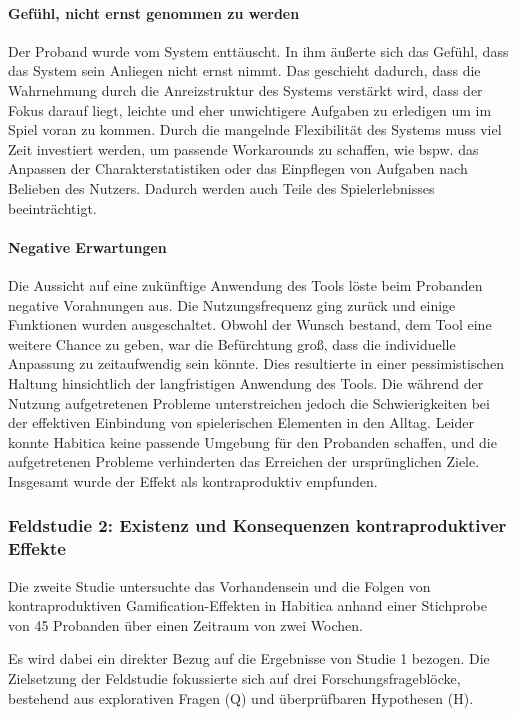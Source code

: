 \documentclass[sigconf, nonacm]{acmart}
\begin{document}
\paragraph{Gefühl, nicht ernst genommen zu werden}\label{sec:sr2}
Der Proband wurde vom System enttäuscht. In ihm äußerte sich das Gefühl, dass das System sein Anliegen nicht ernst nimmt. Das geschieht dadurch, dass die Wahrnehmung durch die Anreizstruktur des Systems verstärkt wird, dass der Fokus darauf liegt, leichte und eher unwichtigere Aufgaben zu erledigen um im Spiel voran zu kommen. 
Durch die mangelnde Flexibilität des Systems muss viel Zeit investiert werden, um passende Workarounds zu schaffen, wie bspw. das Anpassen der Charakterstatistiken oder das Einpflegen von Aufgaben nach Belieben des Nutzers. Dadurch werden auch Teile des Spielerlebnisses beeinträchtigt.

\paragraph{Negative Erwartungen}\label{sec:sr3}
Die Aussicht auf eine zukünftige Anwendung des Tools löste beim Probanden negative Vorahnungen aus. Die Nutzungsfrequenz ging zurück und einige Funktionen wurden ausgeschaltet. Obwohl der Wunsch bestand, dem Tool eine weitere Chance zu geben, war die Befürchtung groß, dass die individuelle Anpassung zu zeitaufwendig sein könnte. Dies resultierte in einer pessimistischen Haltung hinsichtlich der langfristigen Anwendung des Tools. Die während der Nutzung aufgetretenen Probleme unterstreichen jedoch die Schwierigkeiten bei der effektiven Einbindung von spielerischen Elementen in den Alltag. Leider konnte Habitica keine passende Umgebung für den Probanden schaffen, und die aufgetretenen Probleme verhinderten das Erreichen der ursprünglichen Ziele. Insgesamt wurde der Effekt als kontraproduktiv empfunden.

\subsubsection{Feldstudie 2: Existenz und Konsequenzen kontraproduktiver Effekte}
Die zweite Studie untersuchte das Vorhandensein und die Folgen von kontraproduktiven Gamification-Effekten in Habitica anhand einer Stichprobe von 45 Probanden über einen Zeitraum von zwei Wochen.

Es wird dabei ein direkter Bezug auf die Ergebnisse von Studie 1 bezogen. Die Zielsetzung der Feldstudie fokussierte sich auf drei Forschungsfrageblöcke, bestehend aus explorativen Fragen (Q) und überprüfbaren Hypothesen (H).
\end{document}
